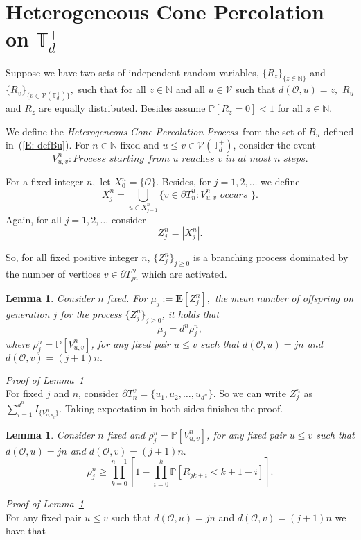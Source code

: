 \documentclass[12pt,reqno,oneside]{amsart}
\theoremstyle{plain}
\newtheorem{lem}[teo]{Lemma}
\theoremstyle{definition}
\numberwithin{equation}{section}
\begin{document}
\section{Heterogeneous Cone Percolation on ${{\mathbb T}}_d^+$}
\label{S: Heterogeneous}

Suppose we have two sets of independent random variables, $\{R_z\}_{\{ z \in {{\mathbb N}} \}}$ and
$\{{\bar R}_v\}_{\{ v \in {\mathcal V}({{\mathbb T}}^+_d) \}},$ such that for all $z \in {{\mathbb N}}$ and all 
$u \in {\mathcal{V}}$ such that $d({\mathcal O},u) = z,$ ${\bar R}_u$ and $R_z$ are equally 
distributed. Besides assume ${{\mathbb P}}[R_z=0] < 1 $ for all $z \in {{\mathbb N}}.$ 

We define
the {\textit{Heterogeneous Cone Percolation Process}}\ from the set of $B_u$ defined in~(\ref{E: defBu}).
For $n \in {{\mathbb N}}$ fixed and $u \leq v \in {\mathcal V}({{\mathbb T}}^+_d)$, consider the event
\[ V^n_{u,v}: \textit{Process starting from $u$ reaches $v$ in at most $n$ steps}.\]

For a fixed integer $n,$ let $ X_0^n = \{{\mathcal O}\}.$ Besides, for 
$ j=1,2, \dots $ we define
\[ X_j^n = \bigcup_{u \in X_{j-1}^n} \{ v \in \partial
T_n^u : V^n_{u,v} \textit{ occurs } \}.\]
Again, for all $ j=1,2, \dots $ consider
\[Z_j^n = | X_j^n |.\]

So, for all fixed positive integer $n$, $\{Z_j^n\}_{j \geq 0}$ is a branching process dominated
by the number of vertices $v \in \partial T^{\mathcal O}_{jn}$ which are activated.
\begin{lem} 
\label{aes1}
Consider $n$ fixed. For $\mu_j := {{\mathbf E}}[Z^n_j],$ the mean number of offspring on generation $j$ for the process 
$\{Z_j^n\}_{j \geq 0}$, it holds that
\begin{displaymath}
\mu_j = d^n \rho_{j}^n,
\end{displaymath}
where $\rho_{j}^n = {{\mathbb P}}[V^n_{u,v}]$, for any fixed pair $u \leq v$ such that $d({\mathcal O},u) =jn$ 
and $d({\mathcal O},v)=(j+1)n.$
\end{lem}
\noindent \textit{Proof of Lemma~\ref{aes1}}\\
For fixed $j$ and $n$, consider $\partial T_n^v = \{ u_1, u_2, \dots , u_{d^n} \}$. So we can write
$Z_j^n$ as $\sum_{i=1}^{d^n}I_{\{V^n_{v,u_i} \}}.$ Taking expectation in both sides finishes the proof.

\begin{lem} \label{aes2}
Consider $n$ fixed and $\rho_{j}^n = {{\mathbb P}}[V^n_{u,v}]$, for any fixed pair $u \leq v$ such that 
$d({\mathcal O},u) =jn$ and $d({\mathcal O},v)=(j+1)n.$
\begin{displaymath}
\rho_{j}^n \geq
\prod_{k=0}^{n-1}[1-\prod_{i=0}^{k}{{\mathbb P}}[R_{jk+i} < k+1-i]].
\end{displaymath}
\end{lem}
\noindent \textit{Proof of Lemma~\ref{aes2}}\\
For any fixed pair $u \leq v$ such that $d({\mathcal O},u) =jn$ and $d({\mathcal O},v)
=(j+1)n$ we have that
\end{document}
